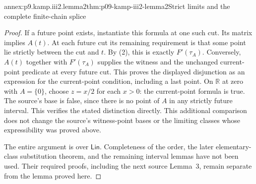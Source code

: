 \begin{annexitem}{annex:p9.kamp.iii2.lemma2}{thm:p09-kamp-iii2-lemma2}{Strict limits and the complete finite-chain splice}
\begin{proof}
If a future point exists, instantiate this formula at one such cut.
Its matrix implies \(A(t)\).  At each future cut its remaining requirement
is that some point lie strictly between the cut and \(t\).  By (2), this
is exactly \(F'(\tau_A)\).  Conversely, \(A(t)\) together with
\(F'(\tau_A)\) supplies the witness and the unchanged current-point
predicate at every future cut.  This proves the displayed disjunction as an
expression for the current-point condition, including a last point.
On \(\mathbb R\) at zero with \(A=\{0\}\), choose \(z=x/2\)
for each \(x>0\): the current-point formula is true.  The source's base is
false, since there is no point of \(A\) in any strictly future interval.
This verifies the stated distinction directly.  This additional comparison
does not change the source's witness-point bases or the limiting classes
whose expressibility was proved above.

The entire argument is over \(\mathsf{Lin}\).  Completeness of the order,
the later elementary-class substitution theorem, and the remaining interval
lemmas have not been used.  Their required proofs, including the next source
Lemma~3, remain separate from the lemma proved here.
\end{proof}
\end{annexitem}
